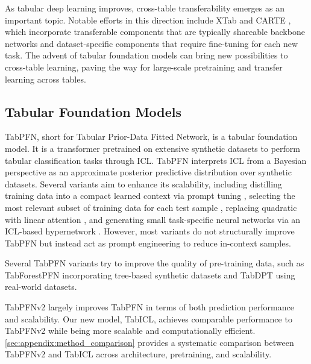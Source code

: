 \documentclass{article}
\theoremstyle{plain}
\theoremstyle{definition}
\theoremstyle{remark}
\begin{document}
As tabular deep learning improves, cross-table transferability emerges as an important topic. Notable efforts in this direction include XTab \cite{zhuXTabCrosstablePretraining2023} and CARTE \cite{kimCARTEPretrainingTransfer2024}, which incorporate transferable components that are typically shareable backbone networks and dataset-specific components that require fine-tuning for each new task. The advent of tabular foundation models can bring new possibilities to cross-table learning, paving the way for large-scale pretraining and transfer learning across tables.

\subsection{Tabular Foundation Models}
\label{ss:tabpfn_offsprings}

TabPFN, short for Tabular Prior-Data Fitted Network, is a tabular foundation model. It is a transformer pretrained on extensive synthetic datasets to perform tabular classification tasks through ICL. TabPFN interprets ICL from a Bayesian perspective as an approximate posterior predictive distribution over synthetic datasets. Several variants aim to enhance its scalability, including distilling training data into a compact learned context via prompt tuning \cite{maInContextDataDistillation2024,feuerTuneTablesContextOptimization2024}, selecting the most relevant subset of training data for each test sample \cite{xuMixtureInContextPrompters2024,thomasRetrievalFineTuningInContext2024,koshilLocalizationDataEmbedding}, replacing quadratic with linear attention \cite{zeng2024tabflex}, and generating small task-specific neural networks via an ICL-based hypernetwork \cite{mullerMotherNetFoundationalHypernetwork2023}. However, most variants do not structurally improve TabPFN but instead act as prompt engineering to reduce in-context samples.

Several TabPFN variants try to improve the quality of pre-training data, such as TabForestPFN \cite{breejenWhyInContextLearning2024} incorporating tree-based synthetic datasets and TabDPT \cite{maTabDPTScalingTabular2024} using real-world datasets.

TabPFNv2 largely improves TabPFN in terms of both prediction performance and scalability. Our new model, TabICL, achieves comparable performance to TabPFNv2 while being more scalable and computationally efficient. \cref{sec:appendix:method_comparison} provides a systematic comparison between TabPFNv2 and TabICL across architecture, pretraining, and scalability.
\end{document}
